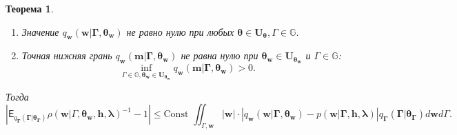 \documentclass[12pt, twoside]{article}
\newtheorem{theorem}{Теорема}
\begin{document}
\begin{theorem}
\begin{enumerate}
\item Значение $q_{\mathbf{w}}\left(\mathbf{w}|\bm{\Gamma}, \bm{\theta}_{\mathbf{w}}\right)$ не равно нулю при любых $\bm{\theta} \in \mathbf{U}_{\bm{\theta}}, \Gamma \in \mathbb{G}$.
\item Точная нижняя грань $q_{\mathbf{w}}\left(\mathbf{m}|\bm{\Gamma}, \bm{\theta}_{\mathbf{w}}\right)$ не равна нулю при $\bm{\theta}_{\mathbf{w}}\in \mathbf{U}_{\bm{\theta}_{\mathbf{w}}}$ и $\Gamma \in \mathbb{G}$:
\[
    \inf_{\Gamma \in \mathbb{G}, \bm{\theta}_{\mathbf{w}}\in \mathbf{U}_{\bm{\theta}_{\mathbf{w}}}} q_{\mathbf{w}}\left(\mathbf{m}|\bm{\Gamma}, \bm{\theta}_{\mathbf{w}}\right) > 0.
\]
\end{enumerate}
Тогда 
\[
   \left|\mathsf{E}_{q_{\bm{\Gamma}}\left(\bm{\Gamma}|\bm{\theta}_{\bm{\Gamma}}\right)} {\rho}(\mathbf{w}|\Gamma, \bm{\theta}_{\mathbf{w}}, \mathbf{h}, \bm{\lambda})^{-1} - 1\right| 
\leq \text{Const } \iint_{\Gamma,\mathbf{w}} |\mathbf{w}| \cdot |q_{\mathbf{w}}\left(\mathbf{w}|\bm{\Gamma}, \bm{\theta}_{\mathbf{w}}\right) - p\left(\mathbf{w}|\bm{\Gamma}, \mathbf{h}, \bm{\lambda}\right)|{q_{\bm{\Gamma}}\left(\bm{\Gamma}|\bm{\theta}_{\bm{\Gamma}}\right)} d\mathbf{w} d\Gamma.
\]
\end{theorem}

\end{document}
